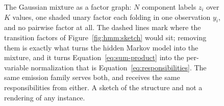 \begin{figure}[htbp]
\centering
{}
\caption{The Gaussian mixture as a factor graph: $N$ component labels $z_i$
over $K$ values, one shaded unary factor each folding in one observation
$y_i$, and no pairwise factor at all. The dashed lines mark where the
transition factors of Figure~\ref{fig:hmm:sketch} would sit; removing them is
exactly what turns the hidden Markov model into the mixture, and it turns
Equation~\ref{eq:sum-product} into the per-variable normalization that is
Equation~\ref{eq:responsibilities}. The same emission family serves both, and
receives the same responsibilities from either. A sketch of the structure and
not a rendering of any instance.}
\label{fig:mixture:sketch}
\end{figure}

